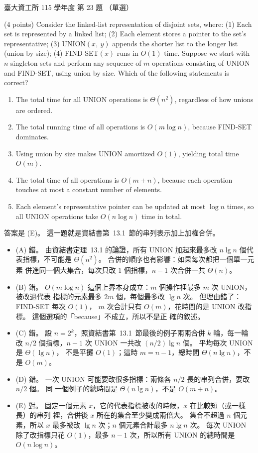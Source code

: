 \begin{pastexam}[label={px:ntu-115-dsa-23}]{臺大資工所 115 學年度 第 23 題}
（單選）

(4 points) Consider the linked-list representation of disjoint sets, where: (1) Each set is represented by a linked list; (2) Each element stores a pointer to the set's representative; (3) UNION$(x,\ y)$ appends the shorter list to the longer list (union by size); (4) FIND-SET$(x)$ runs in $O(1)$ time. Suppose we start with $n$ singleton sets and perform any sequence of $m$ operations consisting of UNION and FIND-SET, using union by size. Which of the following statements is correct?
\begin{enumerate}[label=(\Alph*)]
\item The total time for all UNION operations is $\Theta(n^2)$, regardless of how unions are ordered.
\item The total running time of all operations is $O(m\log n)$, because FIND-SET dominates.
\item Using union by size makes UNION amortized $O(1)$, yielding total time $O(m)$.
\item The total time of all operations is $O(m+n)$, because each operation touches at most a constant number of elements.
\item Each element's representative pointer can be updated at most $\log n$ times, so all UNION operations take $O(n\log n)$ time in total.
\end{enumerate}
\end{pastexam}

\begin{pastsoln}
答案是 (E)。 這一題就是資結書第~13.1~節的串列表示加上加權合併。
\begin{itemize}
\item (A) 錯。 由資結書定理~13.1 的論證，所有 UNION 加起來最多改
$n \lg n$ 個代表指標，不可能是 $\Theta(n^2)$。 合併的順序也有影響：如果每次都把一個單一元素
併進同一個大集合，每次只改 $1$ 個指標，$n - 1$ 次合併一共 $\Theta(n)$。
\item (B) 錯。 $O(m \log n)$ 這個上界本身成立：$m$ 個操作裡最多 $m$ 次 UNION，被改過代表
指標的元素最多 $2m$ 個，每個最多改 $\lg n$ 次。 但理由錯了：FIND-SET 每次 $O(1)$，
$m$ 次合計只有 $O(m)$，花時間的是 UNION 改指標。 這個選項的「because」不成立，所以不是正
確的敘述。
\item (C) 錯。 設 $n = 2^k$，照資結書第~13.1~節最後的例子兩兩合併 $k$ 輪，每一輪改
$n/2$ 個指標，$n - 1$ 次 UNION 一共改 $(n/2)\lg n$ 個。 平均每次 UNION 是 $\Theta(\lg n)$，
不是平攤 $O(1)$；這時 $m = n - 1$，總時間 $\Theta(n \lg n)$，不是 $O(m)$。
\item (D) 錯。 一次 UNION 可能要改很多指標：兩條各 $n/2$ 長的串列合併，要改 $n/2$ 個。 同
一個例子的總時間是 $\Theta(n \lg n)$，不是 $O(m + n)$。
\item (E) 對。 固定一個元素 $x$，它的代表指標被改的時候，$x$ 在比較短（或一樣長）的串列
裡，合併後 $x$ 所在的集合至少變成兩倍大。 集合不超過 $n$ 個元素，所以 $x$ 最多被改
$\lg n$ 次；$n$ 個元素合計最多 $n \lg n$ 次。 每次 UNION 除了改指標只花 $O(1)$，最多
$n - 1$ 次，所以所有 UNION 的總時間是 $O(n \log n)$。
\end{itemize}
\end{pastsoln}
